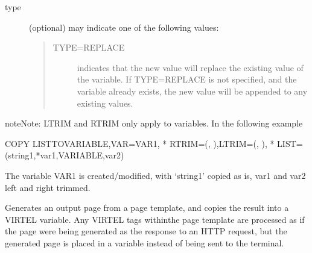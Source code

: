 \documentclass[letterpaper,10pt,english]{sphinxmanual}
\begin{document}
\begin{description}
\item[{type}] \leavevmode
(optional) may indicate one of the following values:
\begin{quote}
\begin{description}
\item[{TYPE=REPLACE}] \leavevmode
indicates that the new value will replace the existing value of the variable. If TYPE=REPLACE is not specified, and the variable already exists, the new value will be appended to any existing values.

\end{description}
\end{quote}

\end{description}

\begin{sphinxadmonition}{note}{Note:}
LTRIM and RTRIM only apply to variables. In the following example
\end{sphinxadmonition}

\begin{sphinxVerbatim}[commandchars=\\\{\}]
COPY\PYGZdl{} LIST\PYGZhy{}TO\PYGZhy{}VARIABLE,VAR=\PYGZsq{}VAR1\PYGZsq{}, *
RTRIM=(\PYGZsq{}\PYGZus{}\PYGZsq{},\PYGZsq{} \PYGZsq{}),LTRIM=(\PYGZsq{}\PYGZus{}\PYGZsq{},\PYGZsq{} \PYGZsq{}), *
LIST=(\PYGZsq{}string1\PYGZsq{},\PYGZsq{}*var1\PYGZsq{},VARIABLE,\PYGZsq{}var2\PYGZsq{})
\end{sphinxVerbatim}

The variable VAR1 is created/modified, with ‘string1’ copied as is, var1 and var2 left and right trimmed.


Generates an output page from a page template, and copies the result into a VIRTEL variable. Any VIRTEL tags withinthe page template are processed as if the page were being generated as the response to an HTTP request, but the generated page is placed in a variable instead of being sent to the terminal.
\end{document}
